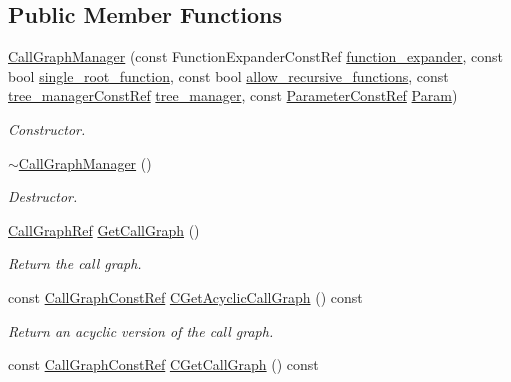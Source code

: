\subsection*{Public Member Functions}
\begin{DoxyCompactItemize}
\item 
\hyperlink{classCallGraphManager_aeee8a134a4099c553dfed2726156f233}{Call\+Graph\+Manager} (const Function\+Expander\+Const\+Ref \hyperlink{classCallGraphManager_a5ce1c00a1075535b68287a08e3fd6b1b}{function\+\_\+expander}, const bool \hyperlink{classCallGraphManager_a84c91d6640ac211ba1d4286d16dcd5d1}{single\+\_\+root\+\_\+function}, const bool \hyperlink{classCallGraphManager_a04e714703a5d955d0ddb00664e89467d}{allow\+\_\+recursive\+\_\+functions}, const \hyperlink{tree__manager_8hpp_a792e3f1f892d7d997a8d8a4a12e39346}{tree\+\_\+manager\+Const\+Ref} \hyperlink{classtree__manager}{tree\+\_\+manager}, const \hyperlink{Parameter_8hpp_a37841774a6fcb479b597fdf8955eb4ea}{Parameter\+Const\+Ref} \hyperlink{classCallGraphManager_a56c89c8fc4a0a38536bcd58005a428cb}{Param})
\begin{DoxyCompactList}\small\item\em Constructor. \end{DoxyCompactList}\item 
\hyperlink{classCallGraphManager_a39f42d18b82be5d809c01a223f01a8c7}{$\sim$\+Call\+Graph\+Manager} ()
\begin{DoxyCompactList}\small\item\em Destructor. \end{DoxyCompactList}\item 
\hyperlink{call__graph_8hpp_a58f2b421619a32f5c5bc35e64f3346d3}{Call\+Graph\+Ref} \hyperlink{classCallGraphManager_a3803aead51f1c180af7d4e28aca8d3d0}{Get\+Call\+Graph} ()
\begin{DoxyCompactList}\small\item\em Return the call graph. \end{DoxyCompactList}\item 
const \hyperlink{call__graph_8hpp_a6effd75e39674b4777714051b70eddf2}{Call\+Graph\+Const\+Ref} \hyperlink{classCallGraphManager_a96c4ad4f6de2cc316df5bb28523e2d29}{C\+Get\+Acyclic\+Call\+Graph} () const
\begin{DoxyCompactList}\small\item\em Return an acyclic version of the call graph. \end{DoxyCompactList}\item 
const \hyperlink{call__graph_8hpp_a6effd75e39674b4777714051b70eddf2}{Call\+Graph\+Const\+Ref} \hyperlink{classCallGraphManager_ab9bcffba4526d85c1b3b915905b9356c}{C\+Get\+Call\+Graph} () const

\end{DoxyCompactItemize}
